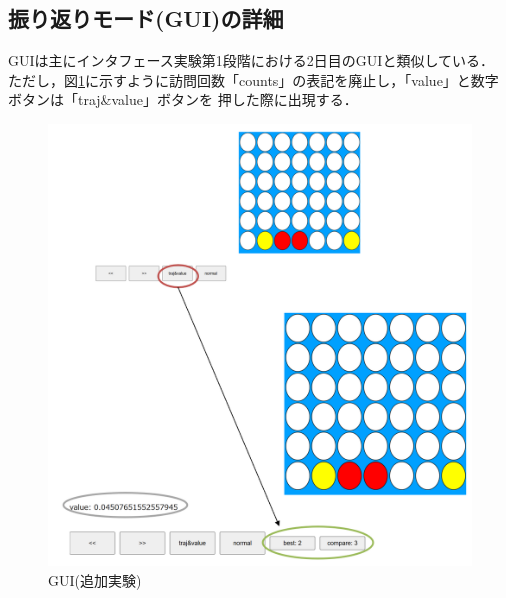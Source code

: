 \subsection{振り返りモード(GUI)の詳細}
GUIは主にインタフェース実験第1段階における2日目のGUIと類似している．
ただし，図\ref{fig:extra}に示すように訪問回数「counts」の表記を廃止し，「value」と数字ボタンは「traj\&value」ボタンを
押した際に出現する．
\begin{figure}[htbp]
	\centering
    \includegraphics[width=\linewidth]{./figure/extra.png}
	\caption{GUI(追加実験)}
	\label{fig:extra}
\end{figure}

